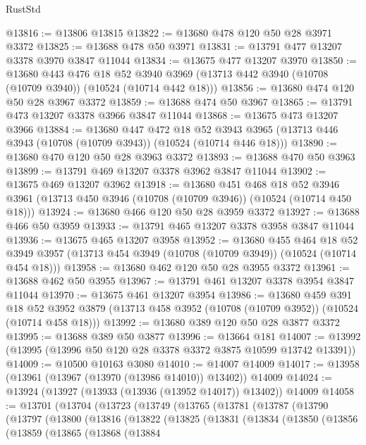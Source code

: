 \begin{lexlean}{RustStd}
\begin{coremodule}
@13816 := @13806 @13815
@13822 := @13680 @478 @120 @50 @28 @3971 @3372
@13825 := @13688 @478 @50 @3971
@13831 := @13791 @477 @13207 @3378 @3970 @3847 @11044
@13834 := @13675 @477 @13207 @3970
@13850 := @13680
    @443
    @476
    @18
    @52
    @3940
    @3969
    (@13713 @442 @3940 (@10708 (@10709 @3940)) (@10524 (@10714 @442 @18)))
@13856 := @13680 @474 @120 @50 @28 @3967 @3372
@13859 := @13688 @474 @50 @3967
@13865 := @13791 @473 @13207 @3378 @3966 @3847 @11044
@13868 := @13675 @473 @13207 @3966
@13884 := @13680
    @447
    @472
    @18
    @52
    @3943
    @3965
    (@13713 @446 @3943 (@10708 (@10709 @3943)) (@10524 (@10714 @446 @18)))
@13890 := @13680 @470 @120 @50 @28 @3963 @3372
@13893 := @13688 @470 @50 @3963
@13899 := @13791 @469 @13207 @3378 @3962 @3847 @11044
@13902 := @13675 @469 @13207 @3962
@13918 := @13680
    @451
    @468
    @18
    @52
    @3946
    @3961
    (@13713 @450 @3946 (@10708 (@10709 @3946)) (@10524 (@10714 @450 @18)))
@13924 := @13680 @466 @120 @50 @28 @3959 @3372
@13927 := @13688 @466 @50 @3959
@13933 := @13791 @465 @13207 @3378 @3958 @3847 @11044
@13936 := @13675 @465 @13207 @3958
@13952 := @13680
    @455
    @464
    @18
    @52
    @3949
    @3957
    (@13713 @454 @3949 (@10708 (@10709 @3949)) (@10524 (@10714 @454 @18)))
@13958 := @13680 @462 @120 @50 @28 @3955 @3372
@13961 := @13688 @462 @50 @3955
@13967 := @13791 @461 @13207 @3378 @3954 @3847 @11044
@13970 := @13675 @461 @13207 @3954
@13986 := @13680
    @459
    @391
    @18
    @52
    @3952
    @3879
    (@13713 @458 @3952 (@10708 (@10709 @3952)) (@10524 (@10714 @458 @18)))
@13992 := @13680 @389 @120 @50 @28 @3877 @3372
@13995 := @13688 @389 @50 @3877
@13996 := @13664 @181
@14007 := @13992 (@13995 (@13996 @50 @120 @28 @3378 @3372 @3875 @10599 @13742 @13391))
@14009 := @10500 @10163 @3080
@14010 := @14007 @14009
@14017 := @13958 (@13961 (@13967 (@13970 (@13986 @14010)) @13402)) @14009
@14024 := @13924 (@13927 (@13933 (@13936 (@13952 @14017)) @13402)) @14009
@14058 := @13701
    (@13704
      (@13723
        (@13749
          (@13765
            (@13781
              (@13787
                (@13790
                  (@13797
                    (@13800
                      (@13816
                        (@13822
                          (@13825
                            (@13831
                              (@13834
                                (@13850
                                  (@13856
                                    (@13859
                                      (@13865
                                        (@13868
                                          (@13884

\end{coremodule}
\end{lexlean}
